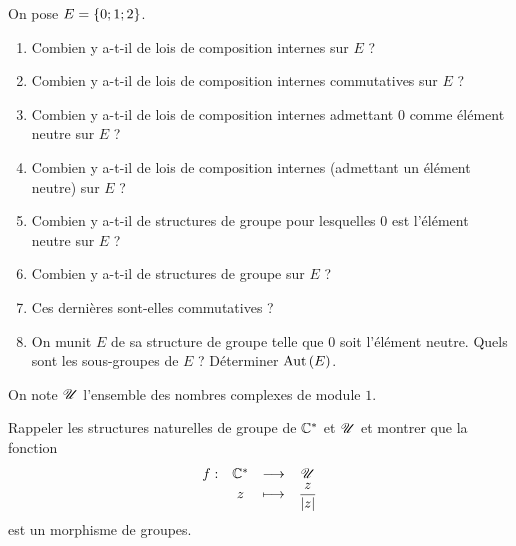 \begin{exo}[Exercice 6]
On pose \(E=\left\lbrace0;1;2\right\rbrace\).

\begin{enumerate}
\item Combien y a-t-il de lois de composition internes sur \(E\) ? \\

\item Combien y a-t-il de lois de composition internes commutatives sur \(E\) ? \\

\item Combien y a-t-il de lois de composition internes admettant \(0\) comme élément neutre sur \(E\) ? \\

\item Combien y a-t-il de lois de composition internes  (\cad admettant un élément neutre) sur \(E\) ? \\

\item Combien y a-t-il de structures de groupe pour lesquelles \(0\) est l'élément neutre sur \(E\) ? \\

\item Combien y a-t-il de structures de groupe sur \(E\) ? \\

\item Ces dernières sont-elles commutatives ? \\

\item On munit \(E\) de sa structure de groupe telle que \(0\) soit l'élément neutre. Quels sont les sous-groupes de \(E\) ? Déterminer \(\operatorname{Aut}\left(E\right)\).
\end{enumerate}
\end{exo}

\begin{corr}
\end{corr}

\begin{exo}[Exercice 7]
On note \(\mathscr{U}\) l'ensemble des nombres complexes de module \(1\).

Rappeler les structures naturelles de groupe de \(\mathbb{C}^*\) et \(\mathscr{U}\) et montrer que la fonction \[\begin{array}[t]{cccc}f : & \mathbb{C}^* & \longrightarrow & \mathscr{U} \\ & z & \longmapsto & \dfrac{z}{\left\lvert z\right\rvert}\end{array}\] est un morphisme de groupes.
\end{exo}

\begin{corr}
\end{corr}

